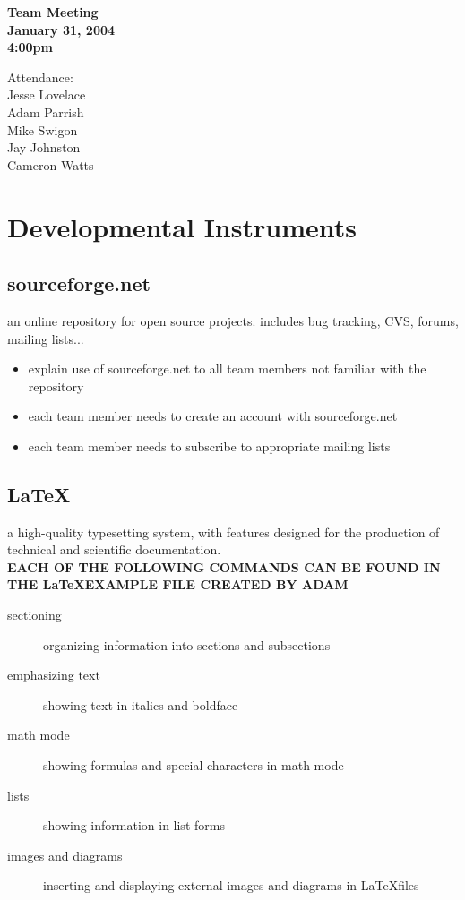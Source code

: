 \documentclass{article}
\begin{document}
\begin{flushleft}
{\bf Team Meeting}\\
{\bf January 31, 2004}\\
{\bf 4:00pm}\\
\end{flushleft}

\begin{flushleft}
Attendance:\\
Jesse Lovelace\\
Adam Parrish\\
Mike Swigon\\
Jay Johnston\\
Cameron Watts\\
\end{flushleft}

\section{Developmental Instruments}
\subsection{sourceforge.net}
an online repository for open source projects.  includes bug
tracking, CVS, forums, mailing lists...

\begin{itemize}
    \item explain use of sourceforge.net to all team members not familiar with the repository
    \item each team member needs to create an account with sourceforge.net
    \item each team member needs to subscribe to appropriate mailing lists
\end{itemize}

\subsection{\LaTeX}
a high-quality typesetting system, with features designed for the
production of technical and scientific documentation. \\{\bf EACH
OF THE FOLLOWING COMMANDS CAN BE FOUND IN THE \LaTeX EXAMPLE FILE
CREATED BY ADAM}

\begin{description}
    \item[sectioning] organizing information into sections and subsections
    \item[emphasizing text] showing text in italics and boldface
    \item[math mode] showing formulas and special characters in math mode
    \item[lists] showing information in list forms
    \item[images and diagrams] inserting and displaying external images and diagrams in \LaTeX files
\end{description}
\end{document}
